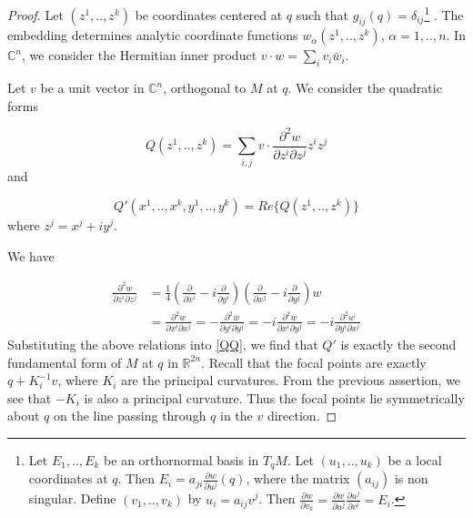 \documentclass[a4paper,11pt,reqno]{amsart}
\newcommand{\RR}{\mathbb{R}}      %
\newcommand{\CC}{\mathbb{C}}
\begin{document}
\begin{proof}
  Let $(z^1, .., z^k)$ be coordinates centered at $q$ such that $g_{ij}(q) =
  \delta_{ij}$\footnote{
    Let $E_1, .., E_k$ be an orthornormal basis in $T_qM$. Let $(u_1, .., u_k)$
    be a local coordinates at $q$. Then $E_i = a_{ji}\frac{\partial w}{\partial
      u^j}(q)$, where the matrix $(a_{ij})$ is non singular. Define $(v_1, ..,
    v_k)$ by $u_i = a_{ij}v^j$. Then $\frac{\partial w}{\partial v_k} =
    \frac{\partial w}{\partial u^j}\frac{\partial u^j}{\partial v^i} = E_i$.}
  . The embedding determines analytic coordinate functions
  $w_\alpha(z^1, .., z^k)$, $\alpha = 1, .., n$.  In $\CC^n$, we consider the
  Hermitian inner product $ v \cdot w = \sum_i v_i\bar{w}_i$.

  Let $v$ be a unit vector in $\CC^n$, orthogonal to $M$ at $q$. We consider the
  quadratic forms

  \begin{equation}
    Q(z^1, .., z^k) = 
    \sum_{i,j} v \cdot \frac{\partial^2 w}{\partial z^i \partial z^j}z^iz^j
  \end{equation}
  and

  \begin{equation}
    \label{QQ}
    Q'(x^1, .., x^k, y^1, .., y^k) = Re\{Q(z^1, .., z^k)\}
  \end{equation}
  where $z^j = x^j+iy^j$.

  We have

  \begin{equation}
    \begin{aligned}
      \frac{\partial^2 w}{\partial z^i \partial z^j} &=
      \frac{1}{4}\left(
        \frac{\partial}{\partial x^i}-i\frac{\partial}{\partial
          y^i}\right)\left(\frac{\partial}{\partial
          x^j}-i\frac{\partial}{\partial y^j}
      \right)w \\
      &= \frac{\partial^2 w}{\partial x^i \partial x^j} =
      -\frac{\partial^2 w}{\partial y^i \partial y^j} = 
      -i\frac{\partial^2 w}{\partial x^i \partial y^j} = 
      -i\frac{\partial^2 w}{\partial y^i \partial x^j}
    \end{aligned}
  \end{equation}
  Substituting the above relations into \eqref{QQ}, we find that $Q'$ is exactly
  the second fundamental form of $M$ at $q$ in $\RR^{2n}$.  Recall that the
  focal points are exactly $q+K_i^{-1}v$, where $K_i$ are the principal
  curvatures. From the previous assertion, we see that $-K_i$ is also a
  principal curvature. Thus the focal points lie symmetrically about $q$ on the
  line passing through $q$ in the $v$ direction.
\end{proof}
\end{document}
